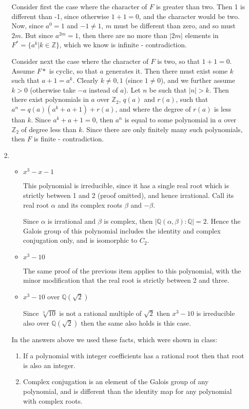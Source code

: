 \documentclass[11pt]{article} \usepackage{amssymb}
\newcommand{\Q}{\mathbb Q}
\newcommand{\Z}{\mathbb Z} \newcommand{\CalE}{{\mathcal{E}}}
\begin{document}
\begin{enumerate}
    Consider first the case where the character of $F$ is greater than two. Then
    1 is different than -1, since otherwise $1+1=0$, and the character would
    be two. Now, since $a^0=1$ and $-1\neq 1$, $m$ must be different than zero, 
    and so must $2m$.
    But since $a^{2m}=1$, then there are no more than $|2m|$ elements 
    in $F^*=\{a^k | k \in \Z\}$, which we know is infinite - contradiction.
    
    Consider next the case where the character of $F$ is two, so that $1+1=0$.
    Assume $F*$ is cyclic, so that $a$ generates it. Then there must exist
    some $k$ such that $a+1=a^k$. Clearly $k\neq 0,1$ (since $1\neq0$), 
    and we further assume $k>0$ (otherwise take $-a$ 
    instead of $a$). Let $n$ be such that $|n|>k$. Then there exist polynomials
    in $a$ over $\Z_2$, 
    $q(a)$ and $r(a)$, such that $a^n=q(a)(a^k+a+1)+r(a)$, and where
    the degree of $r(a)$ is less than $k$. Since $a^k+a+1=0$, then $a^n$ is equal
    to some polynomial in $a$ over $\Z_2$ of degree less than $k$. Since
    there are only finitely many such polynomials, then $F$ is finite - 
    contradiction.

  \item
    \begin{itemize}
    \item $x^3-x-1$

      This polynomial is irreducible, since it has a single real root which
      is strictly between 1 and 2 (proof omitted), and hence irrational. 
      Call its real root
      $\alpha$ and its complex roots $\beta$ and $-\beta$. 

      Since $\alpha$ is irrational and $\beta$ is complex, then 
      $|\Q(\alpha,\beta):\Q|=2$. Hence the Galois group of this polynomial
      includes the identity and complex conjugation only, and is isomorphic
      to $C_2$.
      
    \item $x^3-10$
      
      The same proof of the previous item applies to this polynomial, with the
      minor modification that the real root is strictly between 2 and three.

    \item $x^3-10$ over $\Q(\sqrt{2})$

      Since $\sqrt[3]{10}$ is not a rational multiple of $\sqrt{2}$ then
      $x^3-10$ is irreducible also over $\Q(\sqrt{2})$ then the same
      also holds is this case.

    \end{itemize}
    In the answers above we used these facts, which were shown in class:
    \begin{enumerate}
    \item If a 
      polynomial with integer coefficients has a rational root then that root
      is also an integer.
    \item Complex conjugation is an element of the Galois group of any 
      polynomial, and is different than the identity map for any polynomial
      with complex roots.
    \end{enumerate}
    

\end{enumerate}
\end{document}
